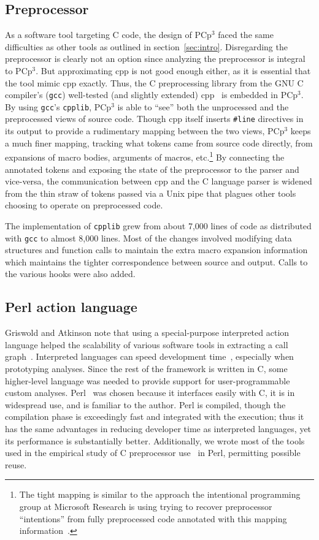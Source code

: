 \documentclass{article}
\newcommand{\pcp}{\mbox{\textsf{PCp}$^3$}}
\newcommand{\Cpp}{\mbox{\textsf{cpp}}}
\newcommand{\Perl}{\mbox{\textsf{Perl}}}
\newcommand{\C}{\mbox{\textsf{C}}}
\newcommand{\ppd}[1]{\texttt{\##1}}
\newcommand{\etc}{etc}  %
\begin{document}
\subsection{Preprocessor}

As a software tool targeting \C{} code, the design of \pcp{} faced the
same difficulties as other tools as outlined in section~\ref{sec:intro}.
Disregarding the preprocessor is clearly not an option since analyzing
the preprocessor is integral to \pcp{}.  But approximating \Cpp{} is not
good enough either, as it is essential that the tool mimic \Cpp{}
exactly. Thus, the \C{} preprocessing library from the GNU \C{}
compiler's (\texttt{gcc}) well-tested (and slightly extended)
\Cpp{}~\cite{GCC} is embedded in \pcp{}.  By using \texttt{gcc}'s
\texttt{cpplib}, \pcp{} is able to ``see'' both the unprocessed and
the preprocessed views of source code.  Though \Cpp{} itself inserts
\ppd{line} directives in its output to provide a rudimentary mapping
between the two views, \pcp{} keeps a much finer mapping, tracking
what tokens came from source code directly, from expansions of macro
bodies, arguments of macros, \etc.\footnote{The tight mapping is similar
  to the approach the intentional programming group at Microsoft
  Research is using trying to recover preprocessor ``intentions'' from
  fully preprocessed code annotated with this mapping
  information~\cite{MSIPPersonal}.}  By connecting the annotated tokens
and exposing the state of the preprocessor to the parser and vice-versa,
the communication between \Cpp{} and the \C{} language parser is widened
from the thin straw of tokens passed via a Unix pipe that plagues other
tools choosing to operate on preprocessed code.

The implementation of \texttt{cpplib} grew from about 7,000 lines of
code as distributed with \texttt{gcc} to almost 8,000 lines.  Most of
the changes involved modifying data structures and function calls to
maintain the extra macro expansion information which maintains the
tighter correspondence between source and output.  Calls to the various
hooks were also added.

\subsection{Perl action language}

Griswold and Atkinson note that using a special-purpose interpreted
action language helped the scalability of various software tools in
extracting a call graph~\cite{Griswold96}.  Interpreted languages can
speed development time~\cite{Scripting}, especially when prototyping
analyses.  Since the rest of the framework is written in \C{}, some
higher-level language was needed to provide support for
user-programmable custom analyses.  \Perl{}~\cite{Perl,Camel} was chosen
because it interfaces easily with \C{}, it is in widespread use, and is
familiar to the author. \Perl{} is compiled, though the compilation
phase is exceedingly fast and integrated with the execution; thus it has
the same advantages in reducing developer time as interpreted languages,
yet its performance is substantially better.  Additionally, we wrote
most of the tools used in the empirical study of \C{} preprocessor
use~\cite{EmpCpp} in \Perl{}, permitting possible reuse.
\end{document}
